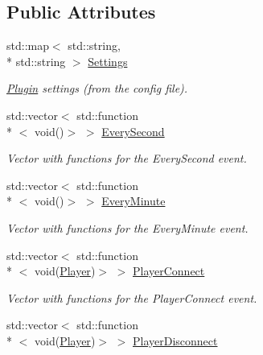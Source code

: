 \subsection*{Public Attributes}
\begin{DoxyCompactItemize}
\item 
\hypertarget{classPlugin_a3ebbb5535520c01fb815ba2f1a7a14e3}{std\-::map$<$ std\-::string, \\*
std\-::string $>$ \hyperlink{classPlugin_a3ebbb5535520c01fb815ba2f1a7a14e3}{Settings}}\label{classPlugin_a3ebbb5535520c01fb815ba2f1a7a14e3}

\begin{DoxyCompactList}\small\item\em \hyperlink{classPlugin}{Plugin} settings (from the config file). \end{DoxyCompactList}\item 
\hypertarget{classPlugin_a91c493ea146d4b463ad3aa5b9ed8bdf3}{std\-::vector$<$ std\-::function\\*
$<$ void()$>$ $>$ \hyperlink{classPlugin_a91c493ea146d4b463ad3aa5b9ed8bdf3}{Every\-Second}}\label{classPlugin_a91c493ea146d4b463ad3aa5b9ed8bdf3}

\begin{DoxyCompactList}\small\item\em Vector with functions for the Every\-Second event. \end{DoxyCompactList}\item 
\hypertarget{classPlugin_a7ef56f89bbd289b36e5a38fa57da1c06}{std\-::vector$<$ std\-::function\\*
$<$ void()$>$ $>$ \hyperlink{classPlugin_a7ef56f89bbd289b36e5a38fa57da1c06}{Every\-Minute}}\label{classPlugin_a7ef56f89bbd289b36e5a38fa57da1c06}

\begin{DoxyCompactList}\small\item\em Vector with functions for the Every\-Minute event. \end{DoxyCompactList}\item 
\hypertarget{classPlugin_a02e032f548c5a002496ab6b02788342b}{std\-::vector$<$ std\-::function\\*
$<$ void(\hyperlink{structPlayer}{Player})$>$ $>$ \hyperlink{classPlugin_a02e032f548c5a002496ab6b02788342b}{Player\-Connect}}\label{classPlugin_a02e032f548c5a002496ab6b02788342b}

\begin{DoxyCompactList}\small\item\em Vector with functions for the Player\-Connect event. \end{DoxyCompactList}\item 
\hypertarget{classPlugin_a3c8dec90190a888e951268b3727b7573}{std\-::vector$<$ std\-::function\\*
$<$ void(\hyperlink{structPlayer}{Player})$>$ $>$ \hyperlink{classPlugin_a3c8dec90190a888e951268b3727b7573}{Player\-Disconnect}}\label{classPlugin_a3c8dec90190a888e951268b3727b7573}


\end{DoxyCompactItemize}
